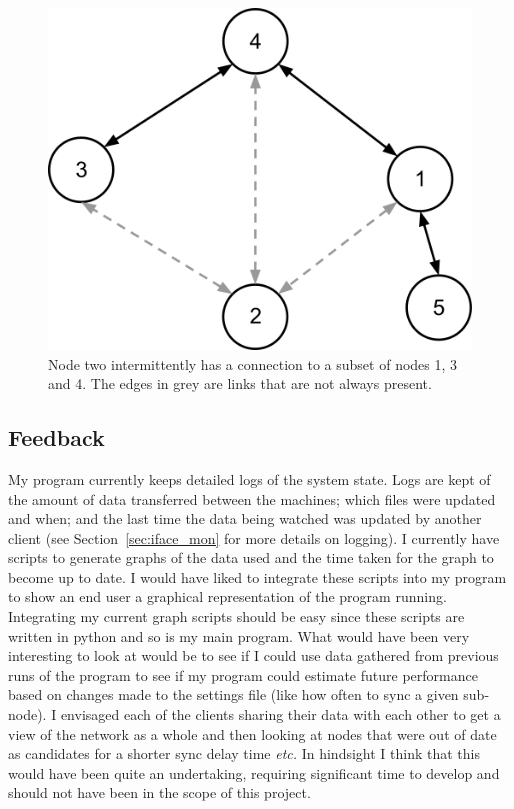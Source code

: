 \documentclass[12pt]{article}
\begin{document}
\begin{figure}[htp]
    \centering
    \includegraphics[scale=0.5]{images/mobile-node.png}
    \caption{Node two intermittently has a connection to a subset
    of nodes 1, 3 and 4. The edges in grey are links that are not
    always present.}
    \label{fig:mobile_node}
\end{figure}

\pagebreak

\subsection{Feedback}
\label{sec:feedback}
My program currently keeps detailed logs of the
system state. Logs are kept of the amount of data
transferred between the machines; which files were updated
and when; and the last time the data being watched was updated
by another client (see Section~\ref{sec:iface_mon} for more details
on logging).
I currently have scripts to generate graphs of the data used
and the time taken for the graph to become up to date.
I would have liked to integrate these scripts into my program
to show an end user a graphical representation of the
program running. Integrating my current graph scripts
should be easy since these scripts are written in python
and so is my main program. What would have been very interesting
to look at would be to see if I could use data gathered
from previous runs of the program to see if my program
could estimate future performance based on changes
made to the settings file (like how often to sync a
given sub-node). I envisaged each of the clients
sharing their data with each other to get a view
of the network as a whole and then looking at nodes
that were out of date as candidates for a shorter
sync delay time \emph{etc.} In hindsight I think that this
would have been quite an undertaking, requiring
significant time to develop and should not have
been in the scope of this project.
\end{document}
